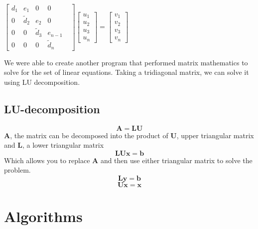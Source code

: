 \documentclass[10pt,showpacs,preprintnumbers,footinbib,amsmath,amssymb,aps,prl,twocolumn,groupedaddress,superscriptaddress,showkeys]{revtex4-1}
\begin{document}
\begin{center}
		$\begin{bmatrix}
			d_{1}& e_{1} & 0 & 0 \\
			0 & \tilde{d}_{2} & e_{2} & 0 & \\
			0 & 0 & \tilde{d}_{3} & e_{n-1}   \\
			0 & 0 & 0 & \tilde{d}_{n} 
	
		\end{bmatrix}
		 \begin{bmatrix}
			u_{1} \\
			u_{2} \\
			u_{3} \\
			u_{n} 
		\end{bmatrix} =
		\begin{bmatrix}
			v_{1} \\
			v_{2} \\
			v_{3} \\
			v_{n}
		\end{bmatrix}$
		\end{center}
	


We were able to create another program that performed matrix mathematics to solve for the set of linear equations.  Taking a tridiagonal matrix, we can solve it using LU decomposition.
	
	\subsection{LU-decomposition}
	
	\begin{equation} \mathbf{A=LU} \end{equation}
$\mathbf{A}$, the matrix can be decomposed into the product of  $\mathbf{U}$, upper triangular matrix and $\mathbf{L}$, a lower triangular matrix
	\begin{equation} \mathbf{LUx=b} \end{equation}
	Which allows you to replace $\mathbf{A}$ and then use either triangular matrix to solve the problem.
	\begin{equation} \mathbf{Ly=b} \end{equation}
	\begin{equation} \mathbf{Ux=x} \end{equation}
\section{Algorithms}	
\end{document}
